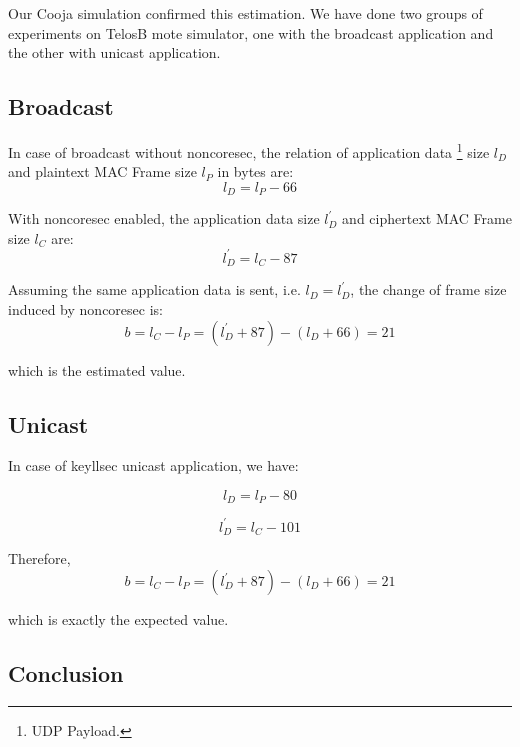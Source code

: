 Our Cooja simulation confirmed this estimation. We have done two groups of experiments on TelosB mote simulator, one with the broadcast application and the other with unicast application.


\subsection{Broadcast}
In case of broadcast without noncoresec, the relation of application data \footnote{UDP Payload.} size $l_D$ and plaintext MAC Frame size $l_P$ in bytes are:
\begin{equation}
	l_D = l_{P} - 66
\end{equation}

With noncoresec enabled, the application data size $l^{\prime}_D$ and ciphertext MAC Frame size $l_C$ are:
\begin{equation} \label{Eq: broadcast llsec data size}
	l^{\prime}_D = l_{C} - 87
\end{equation}

Assuming the same application data is sent, i.e. $l_D = l^{\prime}_D$, the change of frame size induced by noncoresec is:
\begin{equation}
	b = l_C - l_P = (l^{\prime}_D + 87) - (l_D + 66) = 21
\end{equation}

which is the estimated value.

\subsection{Unicast}

In case of keyllsec unicast application, we have:

\begin{equation}
	l_D= l_P - 80
\end{equation}

\begin{equation} \label{Eq: unicast llsec data size}
	l^{\prime}_D = l_{C} - 101 
\end{equation}

Therefore, 
\begin{equation}
	b = l_C - l_P = (l^{\prime}_D + 87) - (l_D + 66) = 21
\end{equation}

which is exactly the expected value.

\subsection{Conclusion}

